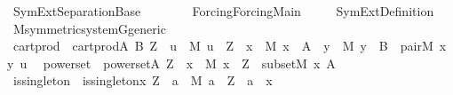 %
\begin{isabellebody}%
%
%
\isadelimtheory
%
\endisadelimtheory
%
\isatagtheory
{}\isamarkupfalse%
\ SymExt{\isacharunderscore}{\kern0pt}Separation{\isacharunderscore}{\kern0pt}Base\isanewline
\ \ \ \isanewline
\ \ \ \ {\isachardoublequoteopen}Forcing{\isacharslash}{\kern0pt}Forcing{\isacharunderscore}{\kern0pt}Main{\isachardoublequoteclose}\ \isanewline
\ \ \ \ SymExt{\isacharunderscore}{\kern0pt}Definition\isanewline
{}%
\endisatagtheory
{\isafoldtheory}%
%
\isadelimtheory
\ \isanewline
%
\endisadelimtheory
\isanewline
{}\isamarkupfalse%
\ M{\isacharunderscore}{\kern0pt}symmetric{\isacharunderscore}{\kern0pt}system{\isacharunderscore}{\kern0pt}G{\isacharunderscore}{\kern0pt}generic\isanewline
{}\isanewline
\isanewline
\isanewline
{}\isamarkupfalse%
\ cartprod{\isacharprime}{\kern0pt}\ \ {\isachardoublequoteopen}cartprod{\isacharprime}{\kern0pt}{\isacharparenleft}{\kern0pt}A{\isacharcomma}{\kern0pt}\ B{\isacharcomma}{\kern0pt}\ Z{\isacharparenright}{\kern0pt}\ {\isasymequiv}\ {\isasymforall}u\ {\isasymin}\ M{\isachardot}{\kern0pt}\ u\ {\isasymin}\ Z\ {\isasymlongleftrightarrow}\ {\isacharparenleft}{\kern0pt}{\isasymexists}x\ {\isasymin}\ M{\isachardot}{\kern0pt}\ x\ {\isasymin}\ A\ {\isasymand}\ {\isacharparenleft}{\kern0pt}{\isasymexists}y\ {\isasymin}\ M{\isachardot}{\kern0pt}\ y\ {\isasymin}\ B\ {\isasymand}\ pair{\isacharparenleft}{\kern0pt}{\isacharhash}{\kern0pt}{\isacharhash}{\kern0pt}M{\isacharcomma}{\kern0pt}\ x{\isacharcomma}{\kern0pt}\ y{\isacharcomma}{\kern0pt}\ u{\isacharparenright}{\kern0pt}{\isacharparenright}{\kern0pt}{\isacharparenright}{\kern0pt}{\isachardoublequoteclose}\ \isanewline
{}\isamarkupfalse%
\ powerset{\isacharprime}{\kern0pt}\ \ {\isachardoublequoteopen}powerset{\isacharprime}{\kern0pt}{\isacharparenleft}{\kern0pt}A{\isacharcomma}{\kern0pt}\ Z{\isacharparenright}{\kern0pt}\ {\isasymequiv}\ {\isasymforall}x\ {\isasymin}\ M{\isachardot}{\kern0pt}\ x\ {\isasymin}\ Z\ {\isasymlongleftrightarrow}\ subset{\isacharparenleft}{\kern0pt}{\isacharhash}{\kern0pt}{\isacharhash}{\kern0pt}M{\isacharcomma}{\kern0pt}\ x{\isacharcomma}{\kern0pt}\ A{\isacharparenright}{\kern0pt}{\isachardoublequoteclose}\isanewline
{}\isamarkupfalse%
\ is{\isacharunderscore}{\kern0pt}singleton{\isacharprime}{\kern0pt}\ \ {\isachardoublequoteopen}is{\isacharunderscore}{\kern0pt}singleton{\isacharprime}{\kern0pt}{\isacharparenleft}{\kern0pt}x{\isacharcomma}{\kern0pt}\ Z{\isacharparenright}{\kern0pt}\ {\isasymequiv}\ {\isasymforall}a\ {\isasymin}\ M{\isachardot}{\kern0pt}\ a\ {\isasymin}\ Z\ {\isasymlongleftrightarrow}\ a\ {\isacharequal}{\kern0pt}\ x{\isachardoublequoteclose}\isanewline

\end{isabellebody}
